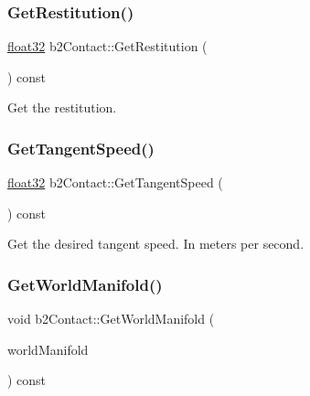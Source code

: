 \mbox{\label{classb2_contact_a9fb6e637026914c8752f89f91122b561}} 
\subsubsection{\texorpdfstring{GetRestitution()}{GetRestitution()}}
{\footnotesize\ttfamily \mbox{\hyperlink{b2_settings_8h_aacdc525d6f7bddb3ae95d5c311bd06a1}{float32}} b2\+Contact\+::\+Get\+Restitution (\begin{DoxyParamCaption}{ }\end{DoxyParamCaption}) const\hspace{0.3cm}{\ttfamily [inline]}}



Get the restitution. 

\mbox{\label{classb2_contact_a927125db0b36947a3bb53c4e3eded1cd}} 
\subsubsection{\texorpdfstring{GetTangentSpeed()}{GetTangentSpeed()}}
{\footnotesize\ttfamily \mbox{\hyperlink{b2_settings_8h_aacdc525d6f7bddb3ae95d5c311bd06a1}{float32}} b2\+Contact\+::\+Get\+Tangent\+Speed (\begin{DoxyParamCaption}{ }\end{DoxyParamCaption}) const\hspace{0.3cm}{\ttfamily [inline]}}



Get the desired tangent speed. In meters per second. 

\mbox{\label{classb2_contact_a7f5645863f6197fa28cc1baafbd11255}} 
\subsubsection{\texorpdfstring{GetWorldManifold()}{GetWorldManifold()}}
{\footnotesize\ttfamily void b2\+Contact\+::\+Get\+World\+Manifold (\begin{DoxyParamCaption}\item[{\mbox{\hyperlink{structb2_world_manifold}{b2\+World\+Manifold}} $\ast$}]{world\+Manifold }\end{DoxyParamCaption}) const\hspace{0.3cm}{\ttfamily [inline]}}



